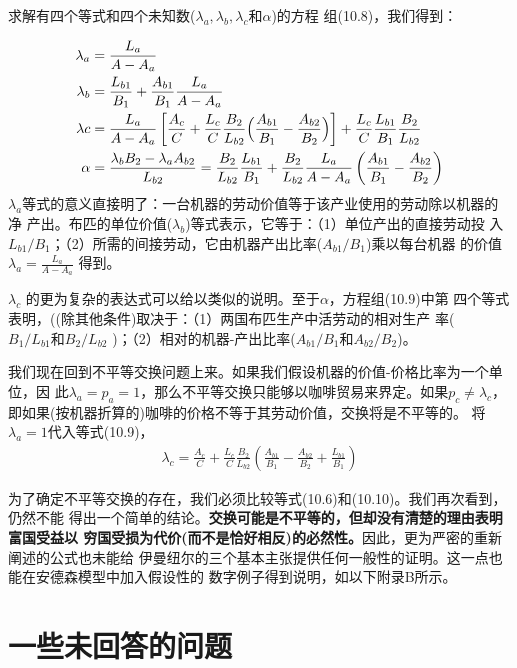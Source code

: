 求解有四个等式和四个未知数($\lambda_a, \lambda_b, \lambda_c和 \alpha $)的方程
组(10.8)，我们得到：

\begin{align}
  \lambda_a &= \frac{L_a}{A-A_a} \notag \\
  \lambda_b &= \frac{L_{b1}}{B_1} + \frac{A_{b1}}{B_1} \frac{L_a}{A-A_a} \notag \\
  \lambda c &= \frac{L_a}{A-A_a} \left[ \frac{A_c}{C} + \frac{L_c}{C}
    \frac{B_2}{L_{b2}} \Bigl( \frac{A_{b1}}{B_1} - \frac{A_{b2}}{B_2} \Bigr)
  \right] + \frac{L_c}{C} \frac{L_{b1}}{B_1} \frac{B_2}{L_{b2}} \notag \\
  \alpha  &= \frac{\lambda_bB_2 - \lambda_aA_{b2}}{L_{b2}} = \frac{B_2}{L_{b2}} \frac{L_{b1}}{B_1} + \frac{B_2}{L_{b2}} \frac{L_a}{A-A_a} \left( \frac{A_{b1}}{B_1}- \frac{A_{b2}}{B_2} \right)
\end{align}
$\lambda_a$等式的意义直接明了：一台机器的劳动价值等于该产业使用的劳动除以机器的净
产出。布匹的单位价值($\lambda_b$)等式表示，它等于：（1）单位产出的直接劳动投
入$L_{b1} / B_1$；（2）所需的间接劳动，它由机器产出比率($A_{b1} / B_1$)乘以每台机器
的价值$\lambda_a= \frac{L_a}{A-A_a}$ 得到。

$\lambda_c$ 的更为复杂的表达式可以给以类似的说明。至于$\alpha$，方程组(10.9)中第
四个等式表明，((除其他条件)取决于：（1）两国布匹生产中活劳动的相对生产
率($B_1 / L_{b1} 和 B_2 / L_{b2}$ )；（2）相对的机器-产出比率($A_{b1} / B_1 和
A_{b2} / B_2$)。

我们现在回到不平等交换问题上来。如果我们假设机器的价值-价格比率为一个单位，因
此$\lambda_a=p_a=1$，那么不平等交换只能够以咖啡贸易来界定。如果$p_c \neq
\lambda_c$，即如果(按机器折算的)咖啡的价格不等于其劳动价值，交换将是不平等的。
将$\lambda_a=1$代入等式(10.9)，
\begin{gather}
  \lambda_c=\frac{A_c}{C} + \frac{L_c}{C} \frac{B_2}{L_{b2}} \left(
    \frac{A_{b1}}{B_1} - \frac{A_{b2}}{B_2} + \frac{L_{b1}}{B_1} \right)
\end{gather}

为了确定不平等交换的存在，我们必须比较等式(10.6)和(10.10)。我们再次看到，仍然不能
得出一个简单的结论。\textbf{交换可能是不平等的，但却没有清楚的理由表明富国受益以
  穷国受损为代价(而不是恰好相反)的必然性。}因此，更为严密的重新阐述的公式也未能给
伊曼纽尔的三个基本主张提供任何一般性的证明。这一点也能在安德森模型中加入假设性的
数字例子得到说明，如以下附录B所示。

\section{一些未回答的问题}

